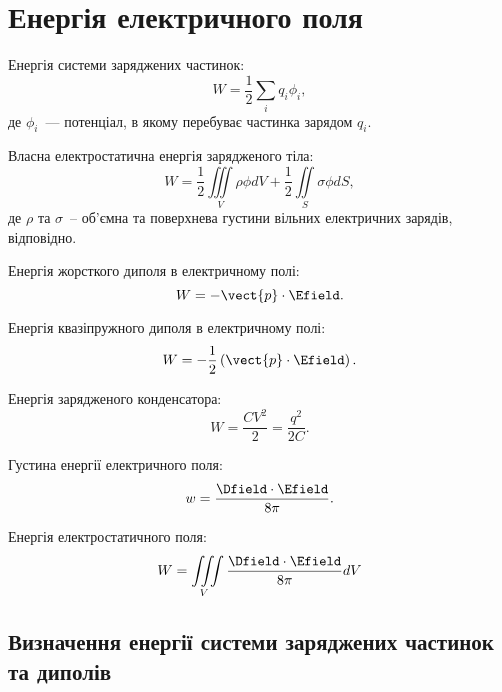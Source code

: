 \section{Енергія електричного поля}

\begin{Theory}\small
Енергія системи заряджених частинок:
\begin{equation}
	W = \frac12\sum\limits_i q_i \phi_i,
\end{equation}
де $\phi_i$~--- потенціал, в якому перебуває частинка зарядом $q_i$.

Власна електростатична енергія зарядженого тіла:
\begin{equation}
	W = \frac12\iiint\limits_{V}\rho\phi dV + \frac12\iint\limits_{S}\sigma\phi dS,
\end{equation}
де $\rho$ та $\sigma$~-- об'ємна та поверхнева густини вільних електричних зарядів, відповідно.

Енергія жорсткого диполя в електричному полі:
\begin{equation}
	W = -\vect{p}\cdot\Efield.
\end{equation}

Енергія квазіпружного диполя в електричному полі:
\begin{equation}
	W = -\frac12 \left( \vect{p}\cdot\Efield \right) .
\end{equation}

Енергія зарядженого конденсатора:
\begin{equation}
	W = \frac{CV^2}{2} = \frac{q^2}{2C}.
\end{equation}

Густина енергії електричного поля:
\begin{equation}
	w = \frac{\Dfield\cdot\Efield}{8\pi}.
\end{equation}

Енергія електростатичного поля:
\begin{equation}
	W = \iiint\limits_V  \frac{\Dfield\cdot\Efield}{8\pi} dV
\end{equation}
\end{Theory}


\subsection*{Визначення енергії системи заряджених частинок та диполів}

